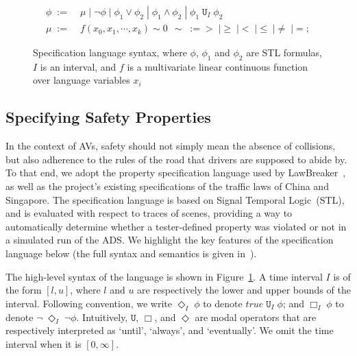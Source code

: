 \begin{figure}[t]
    \centering\footnotesize
    \begin{align*}
    \phi\;:=&\;\mu \;
     |\;\neg\phi\;
     |\;\phi_1 \lor \phi_2\;|\; \phi_1 \land \phi_2\;|\; \phi_1 \;\mathtt{U}_I\; \phi_2\;\\
    \mu\;:=&\;f(x_0,x_1,\cdots, x_k) \sim 0 \ \ \sim \;:= > \;| \geq\;| <\;| \leq\;| \neq\;| =;
    \end{align*}
    \captionsetup{skip=0pt}
    \caption{Specification language syntax, where $\phi$, $\phi_1$ and $\phi_2$ are STL formulas, $I$ is an interval, and $f$ is a multivariate linear continuous function over language variables $x_i$}
    \label{syntax}\vspace{-10pt}
\end{figure}


\subsection{Specifying Safety Properties}
\label{sec:Specification definition}
In the context of AVs, safety should not simply mean the absence of collisions, but also adherence to the rules of the road that drivers are supposed to abide by.
To that end, we adopt the property specification language used by LawBreaker~\cite{Sun-Poskitt-et_al22a}, as well as the project's existing specifications of the traffic laws of China and Singapore.
The specification language is based on Signal Temporal Logic~(STL), and is evaluated with respect to traces of scenes, providing a way to automatically determine whether a tester-defined property was violated or not in a simulated run of the ADS.
We highlight the key features of the specification language below (the full syntax and semantics is given in~\cite{Sun-Poskitt-et_al22a}).


The high-level syntax of the language is shown in Figure~\ref{syntax}.
A time interval $I$ is of the form $[l,u]$, where $l$ and $u$ are respectively the lower and upper bounds of the interval. 
Following convention, we write $\Diamond_I \; \phi$ to denote $true \; \mathtt{U}_I \; \phi$; and $\Box_I \; \phi$ to denote $\neg \; \Diamond_I \; \neg \phi$. Intuitively, $\mathtt{U}$, $\Box$, and $\Diamond$ are modal operators that are respectively interpreted as `until', `always', and `eventually'.
We omit the time interval when it is $[0, \infty]$.




